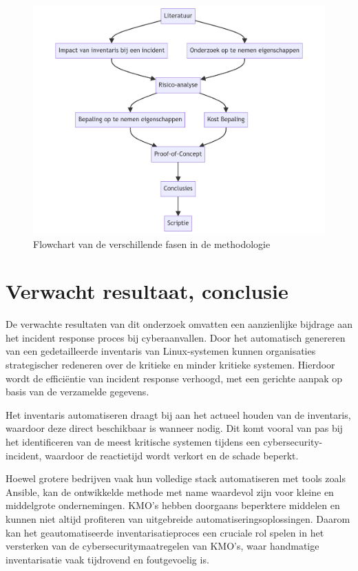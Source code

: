 \begin{figure}
    \includegraphics[width=.49\textwidth]
    {graphics/methodologie_flowchart.png}
    \caption{\label{fig:chart}Flowchart van de verschillende fasen in de methodologie}
\end{figure}

\section{Verwacht resultaat, conclusie}%
\label{sec:verwachte_resultaten}

De verwachte resultaten van dit onderzoek omvatten een aanzienlijke bijdrage aan het incident response proces bij cyberaanvallen. Door het automatisch genereren van een gedetailleerde inventaris van Linux-systemen kunnen organisaties strategischer redeneren over de kritieke en minder kritieke systemen. Hierdoor wordt de efficiëntie van incident response verhoogd, met een gerichte aanpak op basis van de verzamelde gegevens.

Het inventaris automatiseren draagt bij aan het actueel houden van de inventaris, waardoor deze direct beschikbaar is wanneer nodig. Dit komt vooral van pas bij het identificeren van de meest kritische systemen tijdens een cybersecurity-incident, waardoor de reactietijd wordt verkort en de schade beperkt.

Hoewel grotere bedrijven vaak hun volledige stack automatiseren met tools zoals Ansible, kan de ontwikkelde methode met name waardevol zijn voor kleine en middelgrote ondernemingen. KMO's hebben doorgaans beperktere middelen en kunnen niet altijd profiteren van uitgebreide automatiseringsoplossingen. Daarom kan het geautomatiseerde inventarisatieproces een cruciale rol spelen in het versterken van de cybersecuritymaatregelen van KMO's, waar handmatige inventarisatie vaak tijdrovend en foutgevoelig is.
